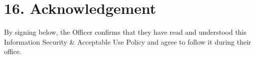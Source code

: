 \documentclass{paridyum}
\begin{document}
\section*{16. Acknowledgement}
By signing below, the Officer confirms that they have read and understood this
Information Security \& Acceptable Use Policy and agree to follow it during their
office.

\vspace{1.5em}
\paridyumsignblock

\vspace{1.5em}
\end{document}
